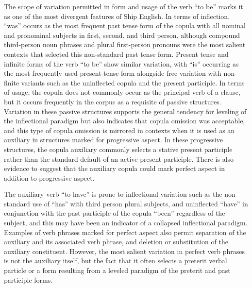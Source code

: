The scope of variation permitted in form and usage of the verb “to be” marks it as one of the most divergent features of Ship English. In terms of inflection, “was” occurs as the most frequent past tense form of the copula with all nominal and pronominal subjects in first, second, and third person, although compound third-person noun phrases and plural first-person pronouns were the most salient contexts that selected this non-standard past tense form. Present tense and infinite forms of the verb “to be” show similar variation, with “is” occurring as the most frequently used present-tense form alongside free variation with non-finite variants such as the uninflected copula and the present participle. In terms of usage, the copula does not commonly occur as the principal verb of a clause, but it occurs frequently in the corpus as a requisite of passive structures. Variation in these passive structures supports the general tendency for leveling of the inflectional paradigm but also indicates that copula omission was acceptable, and this type of copula omission is mirrored in contexts when it is used as an auxiliary in structures marked for progressive aspect.  In these progressive structures, the copula auxiliary commonly selects a stative present participle rather than the standard default of an active present participle. There is also evidence to suggest that the auxiliary copula could mark perfect aspect in addition to progressive aspect. 

The auxiliary verb “to have” is prone to inflectional variation such as the non-standard use of “has” with third person plural subjects, and uninflected “have” in conjunction with the past participle of the copula “been” regardless of the subject, and this may have been an indicator of a collapsed inflectional paradigm. Examples of verb phrases marked for perfect aspect also permit separation of the auxiliary and its associated verb phrase, and deletion or substitution of the auxiliary constituent. However, the most salient variation in perfect verb phrases is not the auxiliary itself, but the fact that it often selects a preterit verbal particle or a form resulting from a leveled paradigm of the preterit and past participle forms. 

